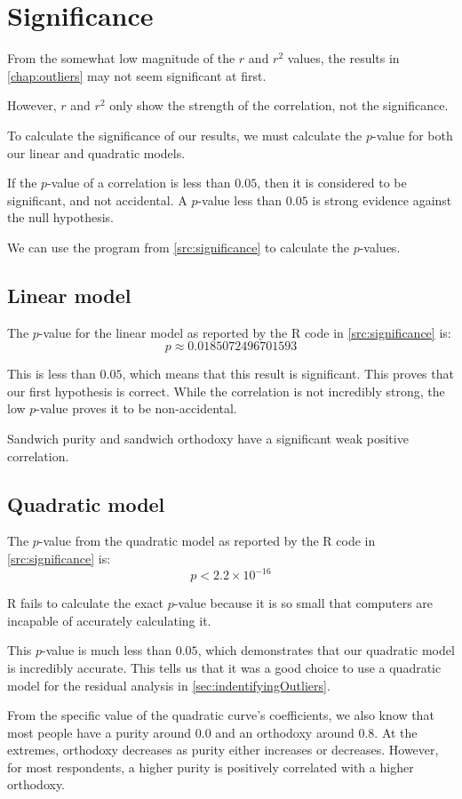 \chapter{Significance}\label{chap:significance}

From the somewhat low magnitude of the $r$ and $r^2$ values, the results in \vref{chap:outliers} may not seem significant at first.

However, $r$ and $r^2$ only show the strength of the correlation, not the significance.

To calculate the significance of our results, we must calculate the $p$-value for both our linear and quadratic models.\cite{pVals}

If the $p$-value of a correlation is less than $0.05$, then it is considered to be significant, and not accidental.
A $p$-value less than $0.05$ is strong evidence against the null hypothesis.\cite{pVals}

We can use the program from \vref{src:significance} to calculate the $p$-values.

\section{Linear model}
The $p$-value for the linear model as reported by the R code in \vref{src:significance} is:
\[p \approx \num{0.0185072496701593}\]

This is less than $0.05$, which means that this result is significant.
This proves that our first hypothesis is correct.
While the correlation is not incredibly strong, the low $p$-value proves it to be non-accidental.

Sandwich purity and sandwich orthodoxy have a significant weak positive correlation.

\section{Quadratic model}
The $p$-value from the quadratic model as reported by the R code in \vref{src:significance} is:
\[p < 2.2 \times 10 ^ {-16}\]

R fails to calculate the exact $p$-value because it is so small that computers are incapable of accurately calculating it.

This $p$-value is much less than $0.05$, which demonstrates that our quadratic model is incredibly accurate.
This tells us that it was a good choice to use a quadratic model for the residual analysis in \vref{sec:indentifyingOutliers}.

From the specific value of the quadratic curve's coefficients, we also know that most people have a purity around $0.0$ and an orthodoxy around $0.8$.
At the extremes, orthodoxy decreases as purity either increases or decreases.
However, for most respondents, a higher purity is positively correlated with a higher orthodoxy.
